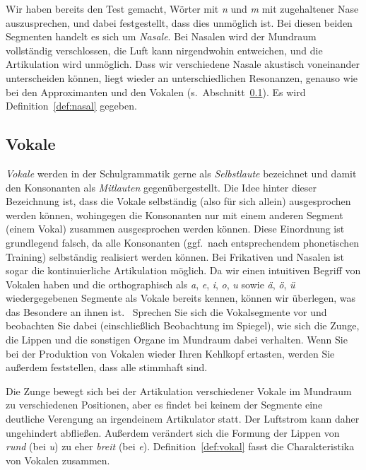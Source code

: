 Wir haben bereits den Test gemacht, Wörter mit \textit{n} und \textit{m} mit zugehaltener Nase auszusprechen, und dabei festgestellt, dass dies unmöglich ist.
Bei diesen beiden Segmenten handelt es sich um \textit{Nasale}.
Bei Nasalen wird der Mundraum vollständig verschlossen, die Luft kann nirgendwohin entweichen, und die Artikulation wird unmöglich.
Dass wir verschiedene Nasale akustisch voneinander unterscheiden können, liegt wieder an unterschiedlichen Resonanzen, genauso wie bei den Approximanten und den Vokalen (s.\ Abschnitt~\ref{sec:vokale}).
Es wird Definition~\ref{def:nasal} gegeben.

\Np


\subsection{Vokale}
\label{sec:vokale}

\textit{Vokale} werden in der Schulgrammatik gerne als \textit{Selbstlaute} bezeichnet und damit den Konsonanten als \textit{Mitlauten} gegenübergestellt.
Die Idee hinter dieser Bezeichnung ist, dass die Vokale selbständig (also für sich allein) ausgesprochen werden können, wohingegen die Konsonanten nur mit einem anderen Segment (einem Vokal) zusammen ausgesprochen werden können.
Diese Einordnung ist grundlegend falsch, da alle Konsonanten (ggf.\ nach entsprechendem phonetischen Training) selbständig realisiert werden können.
Bei Frikativen und Nasalen ist sogar die kontinuierliche Artikulation möglich.
Da wir einen intuitiven Begriff von Vokalen haben und die orthographisch als \textit{a}, \textit{e}, \textit{i}, \textit{o}, \textit{u} sowie \textit{ä}, \textit{ö}, \textit{ü} wiedergegebenen Segmente als Vokale bereits kennen, können wir überlegen, was das Besondere an ihnen ist.
\TuBegin~Sprechen Sie sich die Vokalsegmente vor und beobachten Sie dabei (einschließlich Beobachtung im Spiegel), wie sich die Zunge, die Lippen und die sonstigen Organe im Mundraum dabei verhalten. Wenn Sie bei der Produktion von Vokalen wieder Ihren Kehlkopf ertasten, werden Sie außerdem feststellen, dass alle stimmhaft sind.

Die Zunge bewegt sich bei der Artikulation verschiedener Vokale im Mund\-raum zu verschiedenen Positionen, aber es findet bei keinem der Segmente eine deutliche Verengung an irgendeinem Artikulator statt.
Der Luftstrom kann daher ungehindert abfließen.
Außerdem verändert sich die Formung der Lippen von \textit{rund} (\zB bei \textit{u}) zu eher \textit{breit} (\zB bei \textit{e}).
Definition~\ref{def:vokal} fasst die Charakteristika von Vokalen zusammen.

